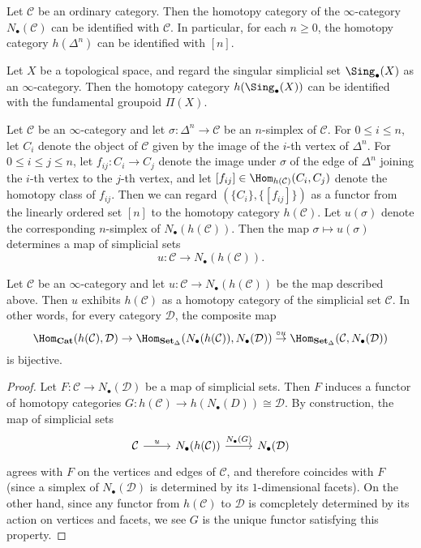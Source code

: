 \begin{example}
Let $\mathcal{C}$ be an ordinary category. Then the homotopy category of the $\infty$-category $N_\bullet(\mathcal{C})$ can be identified with $\mathcal{C}$. In particular, for each $n\geq 0$, the homotopy category $h(\Delta^n)$ can be identified with $[n]$.
\end{example}
\begin{example}
Let $X$ be a topological space, and regard the singular simplicial set $\Sing_\bullet(X)$ as an $\infty$-category. Then the homotopy category $h(\Sing_\bullet(X))$ can be identified with the fundamental groupoid $\Pi(X)$.
\end{example}
Let $\mathcal{C}$ be an $\infty$-category and let $\sigma:\Delta^n\to\mathcal{C}$ be an $n$-simplex of $\mathcal{C}$. For $0\leq i\leq n$, let $C_i$ denote the object of $\mathcal{C}$ given by the image of the $i$-th vertex of $\Delta^n$. For $0\leq i\leq j\leq n$, let $f_{ij}:C_i\to C_j$ denote the image under $\sigma$ of the edge of $\Delta^n$ joining the $i$-th vertex to the $j$-th vertex, and let $[f_{ij}]\in\Hom_{h(\mathcal{C})}(C_i,C_j)$ denote the homotopy class of $f_{ij}$. Then we can regard $(\{C_i\},\{[f_{ij}]\})$ as a functor from the linearly ordered set $[n]$ to the homotopy category $h(\mathcal{C})$. Let $u(\sigma)$ denote the corresponding $n$-simplex of $N_\bullet(h(\mathcal{C}))$. Then the map $\sigma\mapsto u(\sigma)$ determines a map of simplicial sets
\[u:\mathcal{C}\to N_\bullet(h(\mathcal{C})).\]
\begin{proposition}\label{simplicial set inf-cat homotopy cat is adjoint}
Let $\mathcal{C}$ be an $\infty$-category and let $u:\mathcal{C}\to N_\bullet(h(\mathcal{C}))$ be the map described above. Then $u$ exhibits $h(\mathcal{C})$ as a homotopy category of the simplicial set $\mathcal{C}$. In other words, for every category $\mathcal{D}$, the composite map
\[\Hom_{\mathbf{Cat}}(h(\mathcal{C}),\mathcal{D})\to\Hom_{\mathbf{Set}_\Delta}(N_\bullet(h(\mathcal{C})),N_\bullet(\mathcal{D}))\stackrel{\circ u}{\to}\Hom_{\mathbf{Set}_\Delta}(\mathcal{C},N_\bullet(\mathcal{D}))\]
is bijective.
\end{proposition}
\begin{proof}
Let $F:\mathcal{C}\to N_\bullet(\mathcal{D})$ be a map of simplicial sets. Then $F$ induces a functor of homotopy categories $G:h(\mathcal{C})\to h(N_\bullet(D))\cong\mathcal{D}$. By construction, the map of simplicial sets
\[\begin{tikzcd}
\mathcal{C}\ar[r,"u"]&N_\bullet(h(\mathcal{C}))\ar[r,"N_\bullet(G)"]&N_\bullet(\mathcal{D})
\end{tikzcd}\]
agrees with $F$ on the vertices and edges of $\mathcal{C}$, and therefore coincides with $F$ (since a simplex of $N_\bullet(\mathcal{D})$ is determined by its $1$-dimensional facets). On the other hand, since any functor from $h(\mathcal{C})$ to $\mathcal{D}$ is comcpletely determined by its action on vertices and facets, we see $G$ is the unique functor satisfying this property. 
\end{proof}
